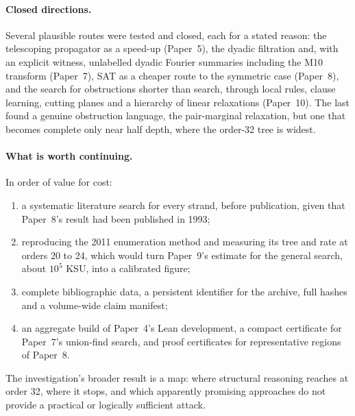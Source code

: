 \paragraph{Closed directions.} Several plausible routes were tested and closed, each for a stated reason:
the telescoping propagator as a speed-up (Paper~5), the dyadic filtration and, with an explicit witness,
unlabelled dyadic Fourier summaries including the M10 transform (Paper~7), SAT as a cheaper route to
the symmetric case (Paper~8), and the search for obstructions shorter than search, through local rules,
clause learning, cutting planes and a hierarchy of linear relaxations (Paper~10). The last found a genuine
obstruction language, the pair-marginal relaxation, but one that becomes complete only near half depth,
where the order-32 tree is widest.

\paragraph{What is worth continuing.} In order of value for cost:
\begin{enumerate}[nosep]
\item a systematic literature search for every strand, before publication, given that Paper~8's
result had been published in 1993;
\item reproducing the 2011 enumeration method and measuring its tree and rate at orders 20 to 24, which
would turn Paper~9's estimate for the general search, about $10^5$ KSU, into a calibrated figure;
\item complete bibliographic data, a persistent identifier for the archive, full hashes and a
volume-wide claim manifest;
\item an aggregate build of Paper~4's Lean development, a compact certificate for Paper~7's
union-find search, and proof certificates for representative regions of Paper~8.
\end{enumerate}
The investigation's broader result is a map: where structural reasoning reaches at order 32, where
it stops, and which apparently promising approaches do not provide a practical or logically
sufficient attack.
